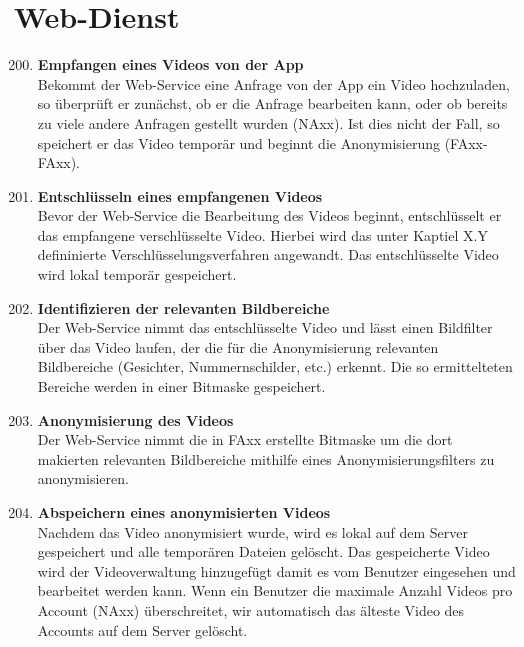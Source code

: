 \section{Web-Dienst}
\begin{enumerate}[\bfseries{FA}10]
\setcounter{enumi}{199}
\item  \textbf{Empfangen eines Videos von der App} \hfill \\
Bekommt der Web-Service eine Anfrage von der App ein Video hochzuladen, so überprüft er zunächst, ob er die Anfrage bearbeiten kann, oder ob bereits zu viele andere Anfragen gestellt wurden (NAxx). Ist dies nicht der Fall, so speichert er das Video temporär und beginnt die Anonymisierung (FAxx-FAxx).

\item  \textbf{Entschlüsseln eines empfangenen Videos} \hfill \\
Bevor der Web-Service die Bearbeitung des Videos beginnt, entschlüsselt er das empfangene verschlüsselte Video. Hierbei wird das unter Kaptiel X.Y defininierte Verschlüsselungsverfahren angewandt. Das entschlüsselte Video wird lokal temporär gespeichert.

\item  \textbf{Identifizieren der relevanten Bildbereiche} \hfill \\
Der Web-Service nimmt das entschlüsselte Video und lässt einen Bildfilter über das Video laufen, der die für die Anonymisierung relevanten Bildbereiche (Gesichter, Nummernschilder, etc.) erkennt. Die so ermittelteten Bereiche werden in einer Bitmaske gespeichert.

\item  \textbf{Anonymisierung des Videos} \hfill \\
Der Web-Service nimmt die in FAxx erstellte Bitmaske um die dort makierten relevanten Bildbereiche mithilfe eines Anonymisierungsfilters zu anonymisieren.

\item  \textbf{Abspeichern eines anonymisierten Videos} \hfill \\
Nachdem das Video anonymisiert wurde, wird es lokal auf dem Server gespeichert und alle temporären Dateien gelöscht. Das gespeicherte Video wird der Videoverwaltung hinzugefügt damit es vom Benutzer eingesehen und bearbeitet werden kann. Wenn ein Benutzer die maximale Anzahl Videos pro Account (NAxx) überschreitet, wir automatisch das älteste Video des Accounts auf dem Server gelöscht.
\end{enumerate}

